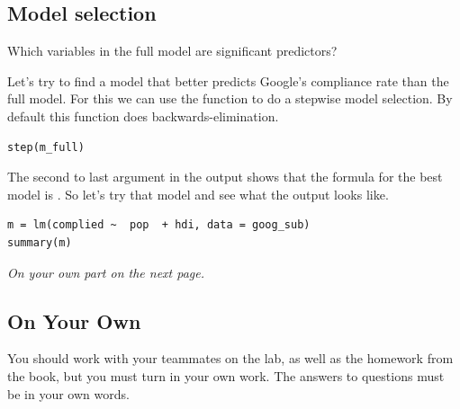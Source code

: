 \documentclass[11pt]{article}
\newcommand{\soln}[1]{ }	%
\begin{document}
\subsection*{Model selection}

\begin{exercise}
Which variables in the full model are significant predictors?
\end{exercise}
\soln{None of them}

Let's try to find a model that better predicts Google's compliance rate than the full model. For this we can use the  function to do a stepwise model selection. By default this function does backwards-elimination.

\begin{lstlisting}
step(m_full)
\end{lstlisting}

The second to last argument in the output shows that the formula for the best model is . So let's try that model and see what the output looks like.

\begin{lstlisting}
m = lm(complied ~  pop  + hdi, data = goog_sub)
summary(m)
\end{lstlisting}

\vfill

\begin{center}
\textit{On your own part on the next page.}
\end{center}

%

\pagebreak

\subsection*{On Your Own}

You should work with your teammates on the lab, as well as the homework from the book, but you must turn in your own work. The answers to questions must be in your own words.\\
\end{document}
